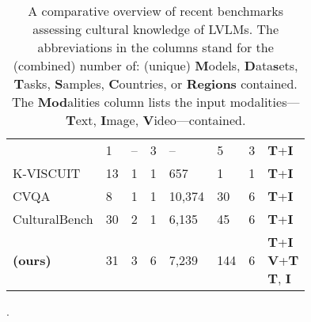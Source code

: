 \begin{table}[t]
{\begin{tabular}{@{}l l l l l l l l@{}}
	\citet{cao2024exploring}              & 1            & {--}          & 3            & {--}         & 5            & 3            & \textbf{T}+\textbf{I}           \\
	\makecell[l]{K-VISCUIT\\\citet{baek2024kviscuit}}              & 13           & 1             & 1            & 657          & 1            & 1            & \textbf{T}+\textbf{I}           \\
	\makecell[l]{CVQA\\\citet{romero2024cvqa}}                & 8            & 1             & 1            & 10,374        & 30           & 6            & \textbf{T}+\textbf{I}           \\
	\makecell[l]{CulturalBench\\\citet{chiu2024culturalbench}}                & 30            & 2             & 1            & 6,135        & 45           & 6            & \textbf{T}+\textbf{I}           \\ \midrule
	\dsname \textbf{(ours)}               & 31           & 3             & 6            & 7,239         & 144          & 6            & \makecell[l]{\textbf{T}+\textbf{I}\\\textbf{V}+\textbf{T}\\\textbf{T}, \textbf{I}} \\
	\bottomrule
\end{tabular}
  }
  \caption{A comparative overview of recent benchmarks assessing cultural knowledge of LVLMs. The abbreviations in the columns stand for the (combined) number of: (unique) \textbf{M}odels, \textbf{D}ata\textbf{s}ets, \textbf{T}asks, \textbf{S}amples, \textbf{C}ountries, or \textbf{Regions} contained. The \textbf{Mod}alities column lists the input modalities---\textbf{T}ext, \textbf{I}mage, \textbf{V}ideo---contained.}.
  \label{tab:rw:compare}
\end{table}
